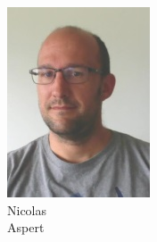 \documentclass[aspectratio=169]{beamer}
\begin{document}
\begin{frame}
\begin{figure}
\begin{subfigure}[b]{0.14\linewidth}
			\includegraphics[width=\linewidth]{picture_nicolas}
			\caption*{Nicolas\\Aspert}
		\end{subfigure}
		\hfill
		\begin{subfigure}[b]{0.14\linewidth}

\end{subfigure}
\end{figure}
\end{frame}
\end{document}
